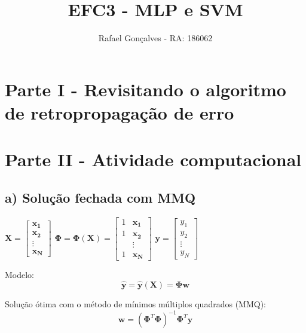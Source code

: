 \documentclass[a4paper, 12pt]{article}
\title{EFC3 - MLP e SVM}
\author{Rafael Gonçalves - RA: 186062}
\begin{document}
\maketitle

\section*{Parte I - Revisitando o algoritmo de retropropagação de erro}


\section*{Parte II - Atividade computacional}

\subsection*{a) Solução fechada com MMQ}

$
\mathbf{X} =\begin{bmatrix}
    \mathbf{x_1} \\
    \mathbf{x_2} \\
    \vdots \\
    \mathbf{x_N}
\end{bmatrix}
$
\hspace{2em}
$
\boldsymbol{\Phi} = \boldsymbol{\Phi}(\mathbf{X}) = \begin{bmatrix}
    1 & \mathbf{x_1} \\
    1 & \mathbf{x_2} \\
    &\vdots \\
    1 & \mathbf{x_N}
\end{bmatrix}
$
\hspace{2em}
$
\mathbf{y} =\begin{bmatrix}
    y_1 \\
    y_2 \\
    \vdots \\
    y_N
\end{bmatrix}
$

\vspace{1em}

Modelo:
\begin{equation}
    \mathbf{\hat{y}} = \mathbf{\hat{y}}(\mathbf{X}) = \boldsymbol{\Phi}\mathbf{w}
\end{equation}

Solução ótima com o método de mínimos múltiplos quadrados (MMQ):
\begin{equation}
    \mathbf{w} = (\boldsymbol{\Phi}^T\boldsymbol{\Phi})^{-1}\boldsymbol{\Phi}^T\mathbf{y}
\end{equation}
\end{document}
